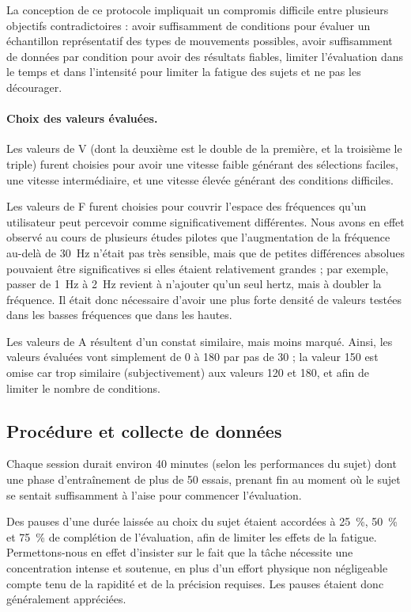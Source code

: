 	La conception de ce protocole impliquait un compromis difficile entre plusieurs objectifs contradictoires : avoir suffisamment de conditions pour évaluer un échantillon représentatif des types de mouvements possibles, avoir suffisamment de données par condition pour avoir des résultats fiables, limiter l'évaluation dans le temps et dans l'intensité pour limiter la fatigue des sujets et ne pas les décourager.
	
	\paragraph{Choix des valeurs évaluées.}
	Les valeurs de V (dont la deuxième est le double de la première, et la troisième le triple) furent choisies pour avoir une vitesse faible générant des sélections faciles, une vitesse intermédiaire, et une vitesse élevée générant des conditions difficiles.
	
	Les valeurs de F furent choisies pour couvrir l'espace des fréquences qu'un utilisateur peut percevoir comme significativement différentes. Nous avons en effet observé au cours de plusieurs études pilotes que l'augmentation de la fréquence au-delà de 30~Hz n'était pas très sensible, mais que de petites différences absolues pouvaient être significatives si elles étaient relativement grandes ; par exemple, passer de 1~Hz à 2~Hz revient à n'ajouter qu'un seul hertz, mais à doubler la fréquence. Il était donc nécessaire d'avoir une plus forte densité de valeurs testées dans les basses fréquences que dans les hautes.
	
	Les valeurs de A résultent d'un constat similaire, mais moins marqué. Ainsi, les valeurs évaluées vont simplement de 0\textdegree{} à 180\textdegree{} par pas de 30\textdegree{} ; la valeur 150\textdegree{} est omise car trop similaire (subjectivement) aux valeurs 120\textdegree{} et 180\textdegree{}, et afin de limiter le nombre de conditions.

	\subsection{Procédure et collecte de données}
	Chaque session durait environ 40 minutes (selon les performances du sujet) dont une phase d'entraînement de plus de 50 essais, prenant fin au moment où le sujet se sentait suffisamment à l'aise pour commencer l'évaluation.
	
	Des pauses d'une durée laissée au choix du sujet étaient accordées à 25~\%{}, 50~\%{} et 75~\%{} de complétion de l'évaluation, afin de limiter les effets de la fatigue. Permettons-nous en effet d'insister sur le fait que la tâche nécessite une concentration intense et soutenue, en plus d'un effort physique non négligeable compte tenu de la rapidité et de la précision requises. Les pauses étaient donc généralement appréciées.
	
